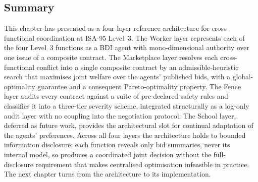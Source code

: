 \subsection*{Summary}

This chapter has presented \NEXUS{} as a four-layer reference
architecture for cross-functional coordination at ISA-95 Level~3. The
Worker layer represents each of the four Level~3 functions as a BDI
agent with mono-dimensional authority over one issue of a composite
contract. The Marketplace layer resolves each cross-functional conflict
into a single composite contract by an admissible-heuristic search that
maximises joint welfare over the agents' published bids, with a
global-optimality guarantee and a consequent Pareto-optimality
property. The Fence layer audits every contract against a suite of
pre-declared safety rules and classifies it into a three-tier severity
scheme, integrated structurally as a log-only audit layer with no
coupling into the negotiation protocol. The School layer, deferred as
future work, provides the architectural slot for continual adaptation
of the agents' preferences. Across all four layers the architecture
holds to bounded information disclosure: each function reveals only
bid summaries, never its internal model, so \NEXUS{} produces a
coordinated joint decision without the full-disclosure requirement that
makes centralised optimisation infeasible in practice. The next chapter
turns from the architecture to its implementation.
